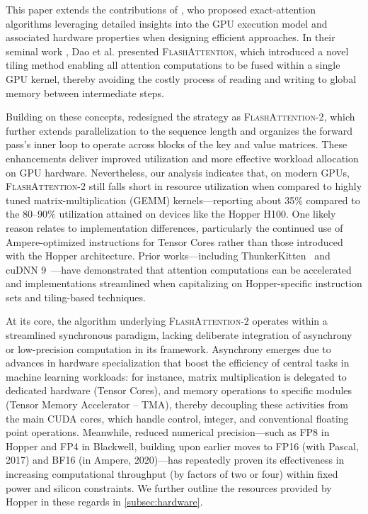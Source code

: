 This paper extends the contributions of \citet{dao2022flashattention}, who proposed exact-attention algorithms leveraging detailed insights into the GPU execution model and associated hardware properties when designing efficient approaches. In their seminal work \citep{dao2022flashattention}, Dao et al. presented \textsc{FlashAttention}, which introduced a novel tiling method enabling all attention computations to be fused within a single GPU kernel, thereby avoiding the costly process of reading and writing to global memory between intermediate steps. 

Building on these concepts, \citet{dao2023flashattention2} redesigned the strategy as \textsc{FlashAttention-2}, which further extends parallelization to the sequence length and organizes the forward pass’s inner loop to operate across blocks of the key and value matrices. These enhancements deliver improved utilization and more effective workload allocation on GPU hardware. Nevertheless, our analysis indicates that, on modern GPUs, \textsc{FlashAttention-2} still falls short in resource utilization when compared to highly tuned matrix-multiplication (GEMM) kernels—reporting about 35\% compared to the 80–90\% utilization attained on devices like the Hopper H100. One likely reason relates to implementation differences, particularly the continued use of Ampere-optimized instructions for Tensor Cores rather than those introduced with the Hopper architecture. Prior works—including ThunkerKitten~\citep{spector2024thunder} and cuDNN 9~\citep{cudnn9}—have demonstrated that attention computations can be accelerated and implementations streamlined when capitalizing on Hopper-specific instruction sets and tiling-based techniques.

At its core, the algorithm underlying \textsc{FlashAttention-2} operates within a streamlined synchronous paradigm, lacking deliberate integration of asynchrony or low-precision computation in its framework. Asynchrony emerges due to advances in hardware specialization that boost the efficiency of central tasks in machine learning workloads: for instance, matrix multiplication is delegated to dedicated hardware (Tensor Cores), and memory operations to specific modules (Tensor Memory Accelerator -- TMA), thereby decoupling these activities from the main CUDA cores, which handle control, integer, and conventional floating point operations. Meanwhile, reduced numerical precision—such as FP8 in Hopper and FP4 in Blackwell, building upon earlier moves to FP16 (with Pascal, 2017) and BF16 (in Ampere, 2020)—has repeatedly proven its effectiveness in increasing computational throughput (by factors of two or four) within fixed power and silicon constraints. We further outline the resources provided by Hopper in these regards in \cref{subsec:hardware}.

